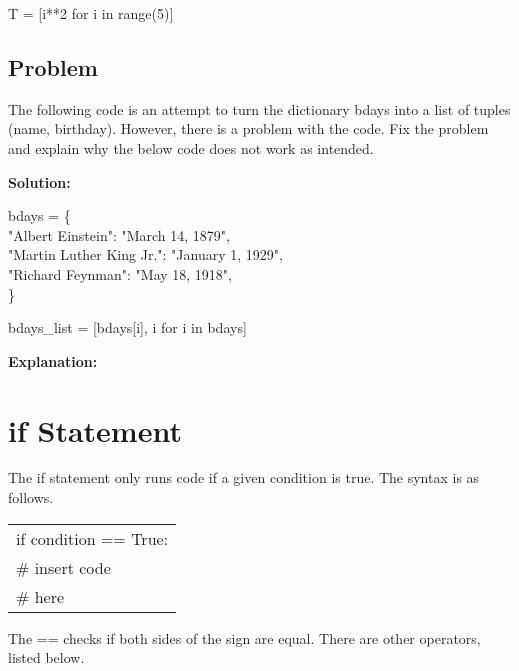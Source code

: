 \documentclass{article}
\newcommand{\define}[1]{\begin{center}\ttfamily #1\end{center}}
\newcommand{\icode}[1]{{\ttfamily #1}}
\newenvironment{code}{\begin{tcolorbox}\ttfamily}{\end{tcolorbox}}
\newenvironment{words}{\begin{tcolorbox}[colback=writing]\ttfamily}{\end{tcolorbox}}
\begin{document}
\define{T = [i**2 for i in range(5)]}

\subsection{Problem}
The following code is an attempt to turn the dictionary \icode{bdays} into a list of tuples \icode{(name, birthday)}. However, there is a problem with the code. Fix the problem and explain why the below code does not work as intended.

\noindent\textbf{Solution:}
\begin{code}
	bdays = \{\\
	\phantom{i}\hspace{2 em}"Albert Einstein": "March 14, 1879",\\
	\phantom{i}\hspace{2 em}"Martin Luther King Jr.": "January 1, 1929",\\
	\phantom{i}\hspace{2 em}"Richard Feynman": "May 18, 1918",\\
	\}
	
	bdays\_list = [bdays[i], i for i in bdays]\\
\end{code}
\noindent\textbf{Explanation:}
\begin{words}
	\vspace{1.2 cm}
\end{words}

\section{\icode{if} Statement}
The \icode{if} statement only runs code if a given condition is true. The syntax is as follows.

\begin{center} \ttfamily
	\begin{tabular}{|l}
		if condition == True:\\
		\hspace{2 em}\# insert code\\
		\hspace{2 em}\# here
	\end{tabular}
\end{center}
The \icode{==} checks if both sides of the sign are equal. There are other operators, listed below.
\end{document}
